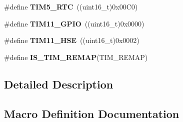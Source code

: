\begin{DoxyCompactItemize}
\item 
\#define {\bfseries T\+I\+M5\+\_\+\+R\+TC}~((uint16\+\_\+t)0x00\+C0)\hypertarget{group___t_i_m___remap_gad95bd2157c29f94703c0942ca3d2b767}{}\label{group___t_i_m___remap_gad95bd2157c29f94703c0942ca3d2b767}

\item 
\#define {\bfseries T\+I\+M11\+\_\+\+G\+P\+IO}~((uint16\+\_\+t)0x0000)\hypertarget{group___t_i_m___remap_ga96850a4ae7ae9590f1ab9c04ec32bb06}{}\label{group___t_i_m___remap_ga96850a4ae7ae9590f1ab9c04ec32bb06}

\item 
\#define {\bfseries T\+I\+M11\+\_\+\+H\+SE}~((uint16\+\_\+t)0x0002)\hypertarget{group___t_i_m___remap_ga1d6d3f53290050b59b202e6d72af673a}{}\label{group___t_i_m___remap_ga1d6d3f53290050b59b202e6d72af673a}

\item 
\#define {\bfseries I\+S\+\_\+\+T\+I\+M\+\_\+\+R\+E\+M\+AP}(T\+I\+M\+\_\+\+R\+E\+M\+AP)
\end{DoxyCompactItemize}


\subsection{Detailed Description}


\subsection{Macro Definition Documentation}
